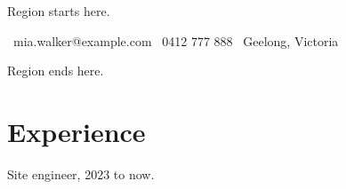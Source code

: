 \documentclass[10pt,a4paper]{article}
\begin{document}
Region starts here.

\faEnvelope\ mia.walker@example.com \quad \faPhone\ 0412 777 888 \quad \faMapMarker\ Geelong, Victoria

Region ends here.

\section{Experience}
Site engineer, 2023 to now.
\end{document}
